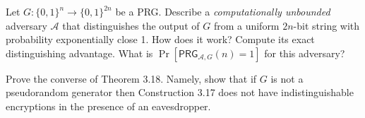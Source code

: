 \documentclass[a4paper,10pt,landscape,twocolumn]{scrartcl}
\begin{document}
\begin{bonusexercise}
Let $G:\{0,1\}^n \rightarrow \{0,1\}^{2n}$ be a PRG. Describe a \emph{computationally unbounded} adversary $\mathcal{A}$ that distinguishes the output of $G$ from a uniform $2n$-bit string with probability exponentially close 1. How does it work? Compute its exact distinguishing advantage. What is $\Pr[\mathsf{PRG}_{\mathcal{A},G}(n)=1]$ for this adversary?
\end{bonusexercise}

\begin{bonusexercise}
Prove the converse of Theorem 3.18. Namely, show that if $G$ is not a pseudorandom generator then Construction 3.17 does not have indistinguishable encryptions in the presence of an eavesdropper.
\end{bonusexercise}
\end{document}
